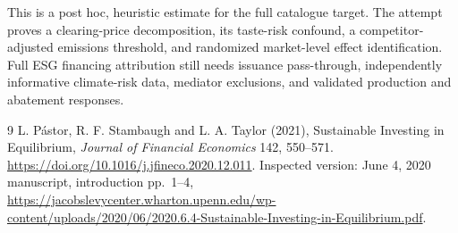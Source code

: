\documentclass[11pt]{article}
\begin{document}
This is a post hoc, heuristic estimate for the full catalogue target.
The attempt proves a clearing-price decomposition, its taste-risk confound, a competitor-adjusted emissions threshold, and randomized market-level effect identification. Full ESG financing attribution still needs issuance pass-through, independently informative climate-risk data, mediator exclusions, and validated production and abatement responses.

\begin{thebibliography}{9}
 L. P\'astor, R. F. Stambaugh and L. A. Taylor (2021),
Sustainable Investing in Equilibrium, \emph{Journal of Financial Economics}
142, 550--571. \url{https://doi.org/10.1016/j.jfineco.2020.12.011}.
Inspected version: June 4, 2020 manuscript, introduction pp.\ 1--4,
\url{https://jacobslevycenter.wharton.upenn.edu/wp-content/uploads/2020/06/2020.6.4-Sustainable-Investing-in-Equilibrium.pdf}.
\end{thebibliography}
\end{document}
